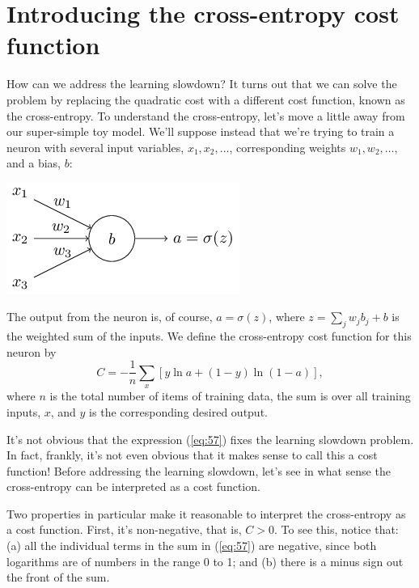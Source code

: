\documentclass[a4paper,twoside,10pt]{book}
\begin{document}
\section{Introducing the cross-entropy cost function}
How can we address the learning slowdown? It turns out that we can solve the problem by replacing the quadratic cost with a different cost function, known as the cross-entropy. To understand the cross-entropy, let's move a little away from our super-simple toy model. We'll suppose instead that we're trying to train a neuron with several input variables, $x_1,x_2,\ldots$, corresponding weights $w_1,w_2,\ldots$, and a bias, $b$:
\begin{center}
	\includegraphics[scale=0.5]{./figures/ch3/tikz29}
\end{center}
The output from the neuron is, of course, $a=\sigma(z)$, where $z=\sum_jw_jb_j+b$ is the weighted sum of the inputs. We define the cross-entropy cost function for this neuron by
\begin{equation}
	C = -\frac{1}{n} \sum_x \left[y \ln a + (1-y ) \ln (1-a) \right],
	\label{eq:57}
\end{equation}
where $n$ is the total number of items of training data, the sum is over all training inputs, $x$, and $y$ is the corresponding desired output.

It's not obvious that the expression (\ref{eq:57}) fixes the learning slowdown problem. In fact, frankly, it's not even obvious that it makes sense to call this a cost function! Before addressing the learning slowdown, let's see in what sense the cross-entropy can be interpreted as a cost function.

Two properties in particular make it reasonable to interpret the cross-entropy as a cost function. First, it's non-negative, that is, $C>0$. To see this, notice that: (a) all the individual terms in the sum in (\ref{eq:57}) are negative, since both logarithms are of numbers in the range 0 to 1; and (b) there is a minus sign out the front of the sum.
\end{document}
